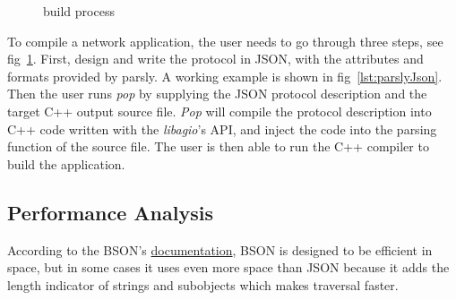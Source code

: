 \documentclass{article}
\begin{document}
\begin{figure}[h!]
\begin{center}
\caption{build process}
\label{fig:builfProcess}
\end{center}
\end{figure}

To compile a network application, the user needs to go through three steps, see fig~\ref{fig:builfProcess}. First, design and write the protocol in JSON, with the attributes and formats provided by parsly. A working example is shown in fig~\ref{lst:parslyJson}. Then the user runs \textit{pop} by supplying the JSON protocol description and the target C++ output source file. \textit{Pop} will compile the protocol description into C++ code written with the \textit{libagio}'s API, and inject the code into the parsing function of the source file. The user is then able to run the C++ compiler to build the application.



\label{subsec:performanceAnalysis}
\subsection{Performance Analysis}
According to the BSON's \href{http://bsonspec.org}{documentation}, BSON is designed to be efficient in space, but in some cases it uses even more space than JSON because it adds the length indicator of strings and subobjects which makes traversal faster.\\
\end{document}
